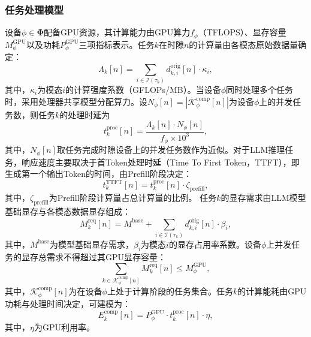 \subsubsection{任务处理模型}\label{sec:task_processing}
设备$\phi\in\boldsymbol{\Phi}$配备GPU资源，其计算能力由GPU算力$f_\phi$（TFLOPS）、显存容量$M_\phi^{\text{GPU}}$以及功耗$P_\phi^{\text{GPU}}$三项指标表示。任务$k$在时隙$n$的计算量由各模态原始数据量确定：
\begin{equation}
\Lambda_k[n] = \sum_{i\in\mathcal{I}(\tau_k)} d_{k,i}^{\text{orig}}[n] \cdot \kappa_i,
\end{equation}
其中，$\kappa_i$为模态$i$的计算强度系数（GFLOPs/MB）。当设备$\phi$同时处理多个任务时，采用处理器共享模型分配算力。设$N_\phi[n] = |\mathcal{K}_\phi^{\text{comp}}[n]|$为设备$\phi$上的并发任务数，则任务$k$的处理时延为
\begin{equation}
t_k^{\text{proc}}[n] = \frac{\Lambda_k[n] \cdot N_\phi[n]}{f_\phi \times 10^3},
\end{equation}
其中，$N_\phi[n]$取任务完成时隙设备上的并发任务数作为近似。对于LLM推理任务，响应速度主要取决于首Token处理时延（Time To First Token，TTFT），即生成第一个输出Token的时间，由Prefill阶段决定：
\begin{equation}\label{eq:t_TTFT}
t_k^{\text{TTFT}}[n] = t_k^{\text{proc}}[n] \cdot \zeta_{\text{prefill}},
\end{equation}
其中，$\zeta_{\text{prefill}}$为Prefill阶段计算量占总计算量的比例。
任务$k$的显存需求由LLM模型基础显存与各模态数据显存组成：
\begin{equation}
M_k^{\text{req}}[n] = M^{\text{base}} + \sum_{i\in\mathcal{I}(\tau_k)} d_{k,i}^{\text{orig}}[n] \cdot \beta_i,
\end{equation}
其中，$M^{\text{base}}$为模型基础显存需求，$\beta_i$为模态$i$的显存占用率系数。设备$\phi$上并发任务的显存总需求不得超过其GPU显存容量：
\begin{equation}
\sum_{k \in \mathcal{K}_\phi^{\text{comp}}[n]} M_k^{\text{req}}[n] \leq M_\phi^{\text{GPU}},
\end{equation}
其中，$\mathcal{K}_\phi^{\text{comp}}[n]$为在设备$\phi$上处于计算阶段的任务集合。任务$k$的计算能耗由GPU功耗与处理时间决定，可建模为：
\begin{equation}
E_k^{\text{comp}}[n] = P_\phi^{\text{GPU}} \cdot t_k^{\text{proc}}[n] \cdot \eta,
\end{equation}
其中，$\eta$为GPU利用率。

